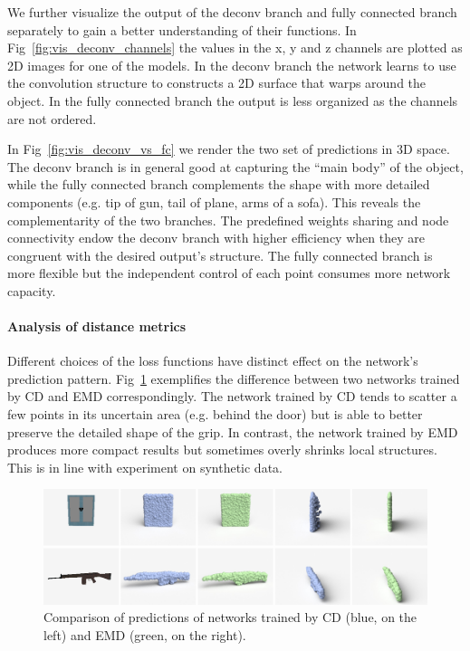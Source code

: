 We further visualize the output of the deconv branch and fully connected branch separately to gain a better understanding of their functions. In Fig~\ref{fig:vis_deconv_channels} the values in the x, y and z channels are plotted as 2D images for one of the models. In the deconv branch the network learns to use the convolution structure to constructs a 2D surface that warps around the object. In the fully connected branch the output is less organized as the channels are not ordered.


In Fig~\ref{fig:vis_deconv_vs_fc} we render the two set of predictions in 3D space. The deconv branch is in general good at capturing the ``main body'' of the object, while the fully connected branch complements the shape with more detailed components (e.g. tip of gun, tail of plane, arms of a sofa). This reveals the complementarity of the two branches. The predefined weights sharing and node connectivity endow the deconv branch with higher efficiency when they are congruent with the desired output's structure. The fully connected branch is more flexible but the independent control of each point consumes more network capacity.



\paragraph{Analysis of distance metrics}

Different choices of the loss functions have distinct effect on the network's prediction pattern. Fig~\ref{fig:emd_vs_chamfer} exemplifies the difference between two networks trained by CD and EMD correspondingly. The network trained by CD tends to scatter a few points in its uncertain area (e.g. behind the door) but is able to better preserve the detailed shape of the grip. In contrast, the network trained by EMD produces more compact results but sometimes overly shrinks local structures. This is in line with experiment on synthetic data.

\begin{figure}[ht!]
  \centering
  \includegraphics[width=\linewidth]{./fig/show_emd_vs_chamfer}
  \caption{Comparison of predictions of networks trained by CD (blue, on the left) and EMD (green, on the right). }\label{fig:emd_vs_chamfer}
  \vspace{-1em}
\end{figure}

